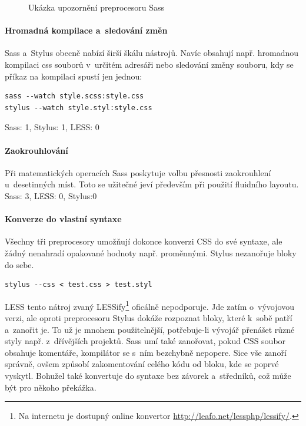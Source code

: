 \documentclass[thesis=B,czech]{FITthesis}[2012/06/26]
\begin{document}
\begin{figure}[h]
	\begin{center}
	\end{center}
	\caption{Ukázka upozornění preprocesoru Sass}
	\label{imgStyl1}
\end{figure}


\paragraph{Hromadná kompilace a~sledování změn}

 \gls{Sass} a~Stylus obecně nabízí širší škálu nástrojů. Navíc obsahují např. hromadnou kompilaci css souborů v~určitém adresáři nebo sledování změny souboru, kdy se příkaz na kompilaci spustí jen jednou:
\scriptsize
\begin{verbatim}
sass --watch style.scss:style.css
stylus --watch style.styl:style.css
\end{verbatim}
\normalsize
\gls{Sass}: 1, Stylus: 1, LESS: 0

\paragraph{Zaokrouhlování}

 Při matematických operacích \gls{Sass} poskytuje volbu přesnosti zaokrouhlení u~desetinných míst. Toto se užitečné jeví především při použití fluidního layoutu.\\ 
\gls{Sass}: 3, LESS: 0, Stylus:0
\paragraph{Konverze do vlastní syntaxe}

 Všechny tři preprocesory umožňují dokonce konverzi \gls{CSS} do své syntaxe, ale žádný nenahradí opakované hodnoty např. proměnnými. Stylus nezanořuje bloky do sebe.
\scriptsize
\begin{verbatim}
stylus --css < test.css > test.styl
\end{verbatim}
\normalsize
LESS tento nátroj zvaný LESSify\footnote{Na internetu je dostupný online konvertor \url{http://leafo.net/lessphp/lessify/}.} oficálně nepodporuje. Jde zatím o~vývojovou verzi, ale oproti preprocesoru Stylus dokáže rozpoznat bloky, které k~sobě patří a~zanořit je. To už je mnohem použitelnější, potřebuje-li vývojář přenášet různé styly např. z~dřívějších projektů. 
\gls{Sass} umí také zanořovat, pokud \gls{CSS} soubor obsahuje komentáře, kompilátor se s~ním bezchybně nepopere. Sice vše zanoří správně, ovšem způsobí zakomentování celého kódu od bloku, kde se poprvé vyskytl. Bohužel také konvertuje do syntaxe bez závorek a~středníků, což může být pro někoho překážka. 
\end{document}

